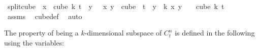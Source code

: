 \begin{isabellebody}
\isamarkupfalse%
\ split{\isacharunderscore}{\kern0pt}cube{\isacharcolon}{\kern0pt}\ \ {\isachardoublequoteopen}x\ {\isasymin}\ cube\ {\isacharparenleft}{\kern0pt}k{\isacharplus}{\kern0pt}{}{\isacharparenright}{\kern0pt}\ t{\isachardoublequoteclose}\ \ {\isachardoublequoteopen}{\isacharparenleft}{\kern0pt}{\isasymlambda}y\ {\isasymin}\ {\isacharbraceleft}{\kern0pt}{\isachardot}{\kern0pt}{\isachardot}{\kern0pt}{\isacharless}{\kern0pt}{}{\isacharbraceright}{\kern0pt}{\isachardot}{\kern0pt}\ x\ y{\isacharparenright}{\kern0pt}\ {\isasymin}\ cube\ {}\ t{\isachardoublequoteclose}\ \ {\isachardoublequoteopen}{\isacharparenleft}{\kern0pt}{\isasymlambda}y\ {\isasymin}\ {\isacharbraceleft}{\kern0pt}{\isachardot}{\kern0pt}{\isachardot}{\kern0pt}{\isacharless}{\kern0pt}k{\isacharbraceright}{\kern0pt}{\isachardot}{\kern0pt}\ x\ {\isacharparenleft}{\kern0pt}y\ {\isacharplus}{\kern0pt}\ {}{\isacharparenright}{\kern0pt}{\isacharparenright}{\kern0pt}\ {\isasymin}\ cube\ k\ t{\isachardoublequoteclose}\isanewline
%
\isadelimproof
\ \ %
\endisadelimproof
%
\isatagproof
{}\isamarkupfalse%
\ assms\ \isamarkupfalse%
\ cube{\isacharunderscore}{\kern0pt}def\ \isamarkupfalse%
\ auto%
\endisatagproof
{\isafoldproof}%
%
\isadelimproof
%
\endisadelimproof
%
\isadelimdocument
%
\endisadelimdocument
%
\isatagdocument
%
\isamarkuptrue%
%
\endisatagdocument
{\isafolddocument}%
%
\isadelimdocument
%
\endisadelimdocument
%
\begin{isamarkuptext}%
The property of being a $k$-dimensional subspace of $C^n_t$ is defined in the following using the variables:


\end{isamarkuptext}
\end{isabellebody}
